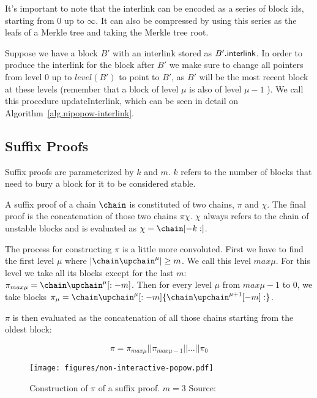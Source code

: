 It's important to note that the interlink can be encoded as a series of block ids, starting from $0$ up to $\infty$. It can also be compressed by using this series as the leafs of a Merkle tree and taking the Merkle tree root.

Suppose we have a block $B'$ with an interlink stored as $B'.{\sf interlink}$. In order to produce the interlink for the block after $B'$ we make sure to change all pointers from level $0$ up to $level(B')$ to point to $B'$, as $B'$ will be the most recent block at these levels (remember that a block of level $\mu$ is also of level $\mu-1$ ). We call this procedure {\sf updateInterlink}, which can be seen in detail on Algorithm~\ref{alg.nipopow-interlink}.



\subsection{Suffix Proofs}
Suffix proofs are parameterized by $k$ and $m$. $k$ refers to the number of blocks that need to bury a block for it to be considered stable.

A suffix proof of a chain $\chain$ is constituted of two chains, $\pi$ and $\chi$. The final proof is the concatenation of those two chains $\pi \chi$. $\chi$ always refers to the chain of unstable blocks and is evaluated as $\chi = \chain[-k:]$.

The process for constructing $\pi$ is a little more convoluted. First we have to find the first level $\mu$ where $|\chain\upchain^\mu| \ge m$. We call this level $max\mu$. For this level we take all its blocks except for the last $m$: $\pi_{max\mu} = \chain\upchain^\mu[:-m]$. Then for every level $\mu$ from $max\mu - 1$ to $0$, we take blocks $\pi_\mu = \chain\upchain^\mu [:-m]\{\chain\upchain^{\mu+1}[-m]:\}$.

$\pi$ is then evaluated as the concatenation  of all those chains starting from the oldest block:

$$ \pi = \pi_{max\mu} || \pi_{max\mu-1} || \ldots || \pi_0 $$

\begin{figure}
  \centering
  \texttt{[image: figures/non-interactive-popow.pdf]}
  \caption{Construction of $\pi$ of a suffix proof. $m=3$  Source:~\cite{nipopows}}
  \label{fig:suffix-proof}
\end{figure}

